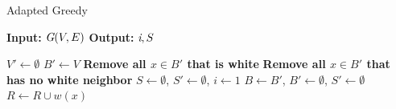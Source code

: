 \documentclass[a4paper,12pt]{report}
\begin{document}

    \begin{algorithm}
    \caption{Adapted Greedy}\label{euclid}
    \hspace*{\algorithmicindent} \textbf{Input:} $\textit G(V, E)$
    \hspace*{\algorithmicindent} \textbf{Output:} $\textit i, S$
    \begin{algorithmic}[1]
    \BState $V' \gets \emptyset$
    \BState $B' \gets V$
    \BState \textbf{Remove all $x \in B'$ that is white}
    \BState \textbf{Remove all $x \in B'$ that has no white neighbor}
    \BState $S \gets \emptyset$, $S' \gets \emptyset$,  $i \gets 1$
        \State $B \gets B'$, $B' \gets \emptyset$, $S' \gets \emptyset$
            \State $R \gets R \cup w(x)$
        \EndFor
        \EndWhile
            \EndIf
    \EndWhile
            \EndIf
        \EndFor
    \EndIf
    \end{algorithmic}
    \end{algorithm}
    
\end{document}
